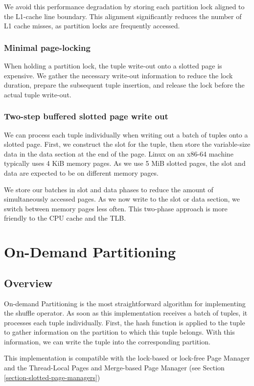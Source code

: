 We avoid this performance degradation by storing each partition lock aligned to the L1-cache line boundary.
This alignment significantly reduces the number of L1 cache misses, as partition locks are frequently accessed.

\subsubsection{Minimal page-locking}
When holding a partition lock, the tuple write-out onto a slotted page is expensive.
We gather the necessary write-out information to reduce the lock duration, prepare the subsequent tuple insertion, and release the lock before the actual tuple write-out.

\subsubsection{Two-step buffered slotted page write out}
We can process each tuple individually when writing out a batch of tuples onto a slotted page.
First, we construct the slot for the tuple, then store the variable-size data in the data section at the end of the page.
Linux on an x86-64 machine typically uses 4 KiB memory pages.
As we use 5 MiB slotted pages, the slot and data are expected to be on different memory pages.

We store our batches in slot and data phases to reduce the amount of simultaneously accessed pages.
As we now write to the slot or data section, we switch between memory pages less often.
This two-phase approach is more friendly to the \ac{CPU} cache and the \ac{TLB}.

\section{On-Demand Partitioning} \label{section-On-Demand-Partitioning}
\subsection{Overview}
On-demand Partitioning is the most straightforward algorithm for implementing the shuffle operator.
As soon as this implementation receives a batch of tuples, it processes each tuple individually.
First, the hash function is applied to the tuple to gather information on the partition to which this tuple belongs.
With this information, we can write the tuple into the corresponding partition.

This implementation is compatible with the lock-based or lock-free Page Manager and the Thread-Local Pages and Merge-based Page Manager (see Section \ref{section-slotted-page-managers})

